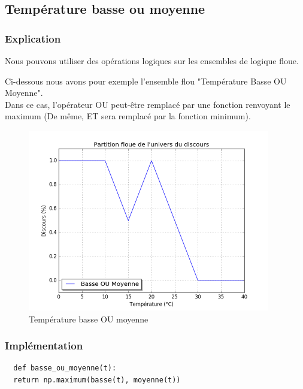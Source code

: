 \documentclass[a4paper]{article}
\begin{document}
\subsection{Température basse ou moyenne}

\subsubsection{Explication}
Nous pouvons utiliser des opérations logiques sur les ensembles de logique floue.

Ci-dessous nous avons pour exemple l'ensemble flou "Température Basse OU Moyenne".\\
Dans ce cas, l'opérateur OU peut-être remplacé par une fonction renvoyant le maximum (De même, ET sera remplacé par la fonction minimum).

\begin{figure}[h]
\begin{center}
	\includegraphics[width=400px]{plot_basse_ou_moyenne.png}
\end{center}
\caption{Température basse OU moyenne}
\end{figure}

\subsubsection{Implémentation}

\begin{lstlisting}
  def basse_ou_moyenne(t):
  return np.maximum(basse(t), moyenne(t))
\end{lstlisting}


\clearpage
\end{document}
